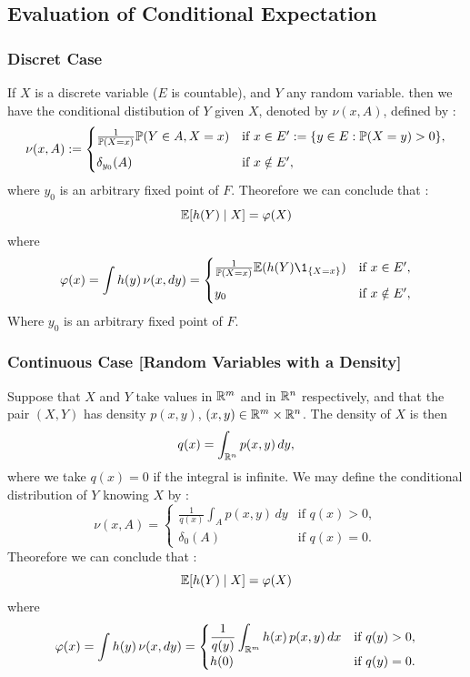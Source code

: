 \documentclass[../Main.tex]{subfiles}
\begin{document}
\subsection{Evaluation of Conditional Expectation}
\subsubsection{Discret Case}
If $X$ is a discrete variable ($E$ is countable), and $Y$ any random variable. then we have the conditional distibution of $Y$ given $X$, denoted by $\nu(x,A)$, defined by :
\[ \nu(x,A) := 
\begin{cases} 
    \frac{1}{\mathbb{P}(X=x)}\mathbb{P}(Y \in A, X = x) & \text{if } x \in E' := \{y \in E : \mathbb{P}(X = y) > 0\}, \\[6pt]
    \delta_{y_0}(A) & \text{if } x \notin E', 
\end{cases} \]
where $y_0$ is an arbitrary fixed point of $F$. Theorefore we can conclude that : 
\[ \mathbb{E}[h(Y) \mid X] = \varphi(X) \]
where
\[ \varphi(x) = \int h(y)\,\nu(x,dy) = 
\begin{cases} 
    \frac{1}{\PP(X=x)}\EE(h(Y)\1_{\{X=x\}}) & \text{if } x \in E' , \\[6pt]
    y_0 & \text{if } x \notin E', 
\end{cases} \]
Where $y_0$ is an arbitrary fixed point of $F$.

\subsubsection{Continuous Case [Random Variables with a Density]}
Suppose that $X$ and $Y$ take values in $\mathbb{R}^m$ and in $\mathbb{R}^n$ respectively, and that the pair $(X,Y)$ has density $p(x,y)$, $(x,y) \in \mathbb{R}^m \times \mathbb{R}^n$. The density of $X$ is then
\[q(x) = \int_{\mathbb{R}^n} p(x,y)\, dy,\]
where we take $q(x) = 0$ if the integral is infinite. We may define the conditional distribution of $Y$ knowing $X$ by :
\[ \nu(x,A) = 
\begin{cases} 
    \frac{1}{q(x)} \int_A p(x,y)\, dy & \text{if } q(x) > 0, \\[6pt]
    \delta_0(A) & \text{if } q(x) = 0. 
\end{cases} 
\]
 Theorefore we can conclude that : 
\[ \mathbb{E}[h(Y) \mid X] = \varphi(X) \]
where
\[ \varphi(x) = \int h(y)\,\nu(x,dy) = 
\begin{cases}
    \dfrac{1}{q(y)} \displaystyle \int_{\mathbb{R}^m} h(x)\, p(x,y)\, dx & \text{if } q(y) > 0, \\
    h(0) & \text{if } q(y) = 0.
\end{cases}\]
\end{document}
